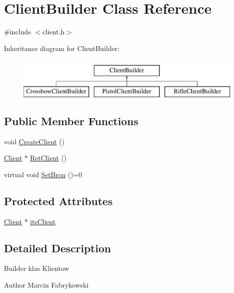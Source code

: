 \hypertarget{classClientBuilder}{
\section{ClientBuilder Class Reference}
\label{classClientBuilder}
}


{\ttfamily \#include $<$client.h$>$}

Inheritance diagram for ClientBuilder:\begin{figure}[H]
\begin{center}
\leavevmode
\includegraphics[height=2.000000cm]{classClientBuilder}
\end{center}
\end{figure}
\subsection*{Public Member Functions}
\begin{DoxyCompactItemize}
\item 
void \hyperlink{classClientBuilder_a1a8a43d20d6452aa8f7e55ff7464d4d9}{CreateClient} ()
\item 
\hyperlink{classClient}{Client} $\ast$ \hyperlink{classClientBuilder_a810820bea069cb0612b6a788f290ae11}{RetClient} ()
\item 
virtual void \hyperlink{classClientBuilder_a7c6225251cb997b4cb9d68c77cb67330}{SetBron} ()=0
\end{DoxyCompactItemize}
\subsection*{Protected Attributes}
\begin{DoxyCompactItemize}
\item 
\hyperlink{classClient}{Client} $\ast$ \hyperlink{classClientBuilder_a18ca0906572c5a1a86000c7a51175c23}{itsClient}
\end{DoxyCompactItemize}


\subsection{Detailed Description}
Builder klas Klientow \begin{DoxyAuthor}{Author}
Marcin Fabrykowski 
\end{DoxyAuthor}



